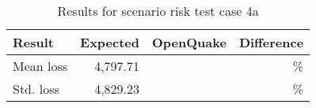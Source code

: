 \begin{table}[htbp]

\centering
\begin{tabular}{ l r r r }

\hline
\rowcolor{anti-flashwhite}
\bf{Result} & \bf{Expected} & \bf{OpenQuake} & \bf{Difference}\\
\hline
Mean loss & 4,797.71 &  & \% \\
Std. loss & 4,829.23 &  & \% \\
\hline
\end{tabular}

\caption{Results for scenario risk test case 4a}
\label{tab:result-scenario-risk-4a}
\end{table}